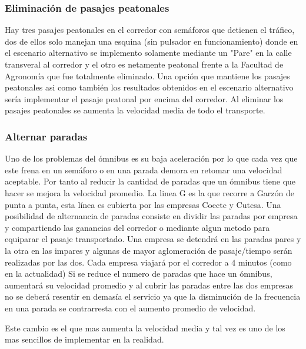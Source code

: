 \subsubsection{Eliminación de pasajes peatonales}
Hay tres pasajes peatonales en el corredor con semáforos que detienen el tráfico, dos de ellos solo manejan una esquina (sin pulsador en funcionamiento) donde en el escenario alternativo se implemento solamente mediante un "Pare" en la calle transveral al corredor y el otro es netamente peatonal frente a la Facultad de Agronomía que fue totalmente eliminado. Una opción que mantiene los pasajes peatonales asi como también los resultados obtenidos en el escenario alternativo sería implementar el pasaje peatonal por encima del corredor. Al eliminar los pasajes peatonales se aumenta la velocidad media de todo el transporte.

\subsubsection{Alternar paradas}

Uno de los problemas del ómnibus es su baja aceleración por lo que cada vez que este frena en un semáforo o en una parada demora en retomar una velocidad aceptable. Por tanto al reducir la cantidad de paradas que un ómnibus tiene que hacer se mejora la velocidad promedio.
La linea G es la que recorre a Garzón de punta a punta, esta línea es cubierta por las empresas Coectc y Cutcsa. Una posibilidad de alternancia de paradas consiste en dividir las paradas por empresa y compartiendo las ganancias del corredor o mediante algun metodo para equiparar el pasaje transportado. Una empresa se detendrá en las paradas pares y la otra en las impares y algunas de mayor aglomeración de pasaje/tiempo serán realizadas por las dos. Cada empresa viajará por el corredor a 4 minutos (como en la actualidad) Si se reduce el numero de paradas que hace un ómnibus, aumentará su velocidad promedio y al cubrir las paradas entre las dos empresas no se deberá resentir en demasía el servicio ya que la disminución de la frecuencia en una parada se contrarresta con el aumento promedio de velocidad.

Este cambio es el que mas aumenta la velocidad media y tal vez es uno de los mas sencillos de implementar en la realidad.

